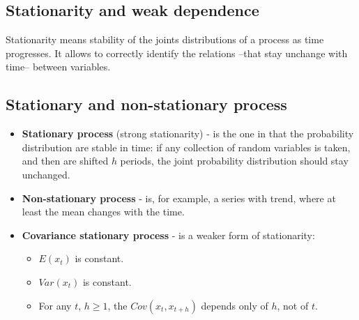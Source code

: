 \documentclass[10pt, a4paper, landscape]{extarticle}
\begin{document}
\begin{multicols}{3}
\columnbreak

\section*{Stationarity and weak dependence}
	Stationarity means stability of the joints distributions of a process as time progresses. It allows to correctly identify the relations --that stay unchange with time-- between variables.
	\subsection*{Stationary and non-stationary process}
		\begin{itemize}[leftmargin=*]
			\item \textbf{Stationary process} (strong stationarity) - is the one in that the probability distribution are stable in time: if any collection of random variables is taken, and then are shifted $h$ periods, the joint probability distribution should stay unchanged.
			\item \textbf{Non-stationary process} - is, for example, a series with trend, where at least the mean changes with the time.
			\item \textbf{Covariance stationary process} - is a weaker form of stationarity:
			\begin{itemize}[leftmargin=*]
			 	\item $E(x_t)$ is constant.
			 	\item $Var(x_t)$ is constant.
			 	\item For any $t$,  $h \geq 1$, the $Cov(x_t, x_{t+h})$ depends only of $h$, not of $t$.
			\end{itemize}
		\end{itemize}

\end{multicols}
\end{document}

